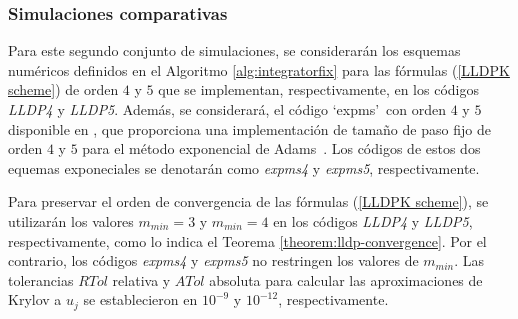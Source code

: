 \subsubsection{Simulaciones comparativas}
Para este segundo conjunto de simulaciones, se considerarán los esquemas numéricos definidos en el Algoritmo \ref{alg:integratorfix} para las fórmulas (\ref{LLDPK scheme}) de orden $4$ y $5$ que se implementan, respectivamente, en los códigos \emph{LLDP4} y \emph{LLDP5}. Además, se considerará, el código \textquoteleft expms\textquoteright~con orden $4$ y $5$ disponible en \cite{jansing2011expode}, que proporciona una implementación de tamaño de paso fijo de orden $4$ y $5$ para el método exponencial de Adams~\cite{hochbruck2011exponential}. Los códigos de estos dos equemas exponeciales se denotarán como \emph{expms4} y \emph{expms5}, respectivamente.

Para preservar el orden de convergencia de las fórmulas (\ref{LLDPK scheme}), se utilizarán los valores $m_{min}=3$ y $m_{min}=4$ en los códigos \emph{LLDP4} y \emph{LLDP5}, respectivamente, como lo indica el Teorema \ref{theorem:lldp-convergence}. Por el contrario, los códigos \emph{expms4} y \emph{expms5} no restringen los valores de $m_{min}$. Las tolerancias $RTol$ relativa y $ATol$ absoluta para calcular las aproximaciones de Krylov a $u_j$ se establecieron en $10^{-9}$ y $10^{-12}$, respectivamente.

